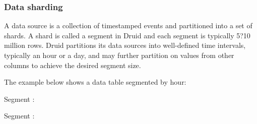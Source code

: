 \documentclass[letterpaper,10pt,english]{sphinxmanual}
\begin{document}
\subsubsection{Data sharding}
\label{\detokenize{discovery/part01/druid_features:sharding}}
A data source is a collection of timestamped events and partitioned into a set of shards. A shard is called a segment in Druid and each segment is typically 5?10 million rows. Druid partitions its data sources into well-defined time intervals, typically an hour or a day, and may further partition on values from other columns to achieve the desired segment size.

The example below shows a data table segmented by hour:

Segment :

\begin{sphinxVerbatim}[commandchars=\\\{\}]
                     
                       
\end{sphinxVerbatim}

Segment :

\begin{sphinxVerbatim}[commandchars=\\\{\}]
                      
                       
\end{sphinxVerbatim}
\end{document}
